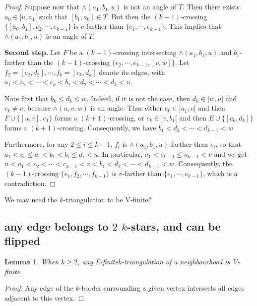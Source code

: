 \documentclass{amsart}
\newtheorem{lemma}[theorem]{Lemma}
\theoremstyle{remark}
\newcommand*{\nbd}[0]{neighbourhood\xspace}
\newcommand*{\ef}[0]{E-finite\xspace}
\newcommand*{\vf}[0]{V-finite\xspace}
\newcommand*{\ktg}[0]{$k$-triangulation\xspace}
\begin{document}
\begin{proof}
Suppose now that $\wedge(a_1, b_1, u)$ is not an angle of $T$. 
Then there exists $a_0 \in ]u, a_1[$ such that $[b_1, a_0] \in  T$. 
But then the $(k - 1)$-crossing $\{[a_0, b_1], e_2, \cdots , e_{k-1}\}$ is $v$-farther than $\{e_1, \cdots , e_{k-1}\}$. 
This implies that $\wedge(a_1, b_1, u)$ is an angle of $T$.

{\bf Second step.}
Let $F$ be a $(k - 1)$-crossing intersecting $\wedge(a_1, b_1, u)$ and $b_1$-farther than the $(k-1)$-crossing $\{e_2, \cdots , e_{k-1}, [v, w]\}$. 
Let $f_2 = [c_2, d_2], \cdots , f_k = [c_k, d_k]$ denote its edges, with $a_1 < c_2 < \cdots < c_k < b_1 < d_2 < \cdots < d_k < u$.

Note first that $b_k \leq d_k \leq w$. 
Indeed, if it is not the case, then $d_k \in ]w, u[$ and $c_k \neq v$, because $\wedge(u, v, w)$ is an angle. 
Thus either $c_k \in ]a_1, v[$ and then $F \cup \{[u, v], e_1\}$ forms a $(k + 1)$-crossing, or $c_k \in ]v, b_1[$ and then $E \cup \{[c_k, d_k]\}$ forms a $(k + 1)$-crossing. 
Consequently, we have $b_1 < d_2 < \cdots < d_{k-1} < w$.

Furthermore, for any $2 \leq i \leq k - 1$, $f_i$ is $\wedge(a_1, b_1, u)$-farther than $e_i$, so that $a_1 < c_i \leq a_i < b_1 < b_i \leq d_i < u$. 
In particular, $a_1 < c_{k-1} \leq a_{k-1} < v$ and we get $u < a_1 < c_2 < \cdots < c_{k-1} < v < b_1 < d_2 < \cdots < d_{k-1} < w$.
Consequently, the $(k - 1)$-crossing $\{e_1, f_2, \cdots , f_{k-1}\}$ is
$v$-farther than $\{e_1, \cdots , e_{k-1}\}$, which is a contradiction.













\end{proof}

We may need the \ktg to be \vf?

\subsection{any edge belongs to $2$ $k$-stars, and can be flipped}

\begin{lemma}
When $k\geq 2$, any \ef \ktg of a \nbd is \vf.
\end{lemma}
\begin{proof}
Any edge of the $k$-border surrounding a given vertex intersects all edges adjacent to this vertex.
\end{proof}
\end{document}
